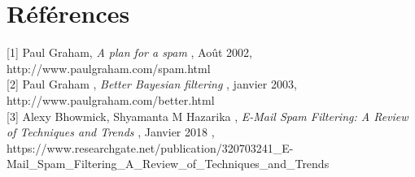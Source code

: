 \documentclass{article}
\begin{document}
\section{Références}


[1] Paul Graham, \textit{A plan for a spam}
, Août 2002, http://www.paulgraham.com/spam.html\\

[2] Paul Graham , \textit{Better Bayesian filtering}
, janvier 2003, http://www.paulgraham.com/better.html\\

[3] Alexy Bhowmick, Shyamanta M Hazarika , \textit{E-Mail Spam Filtering: A Review of Techniques and Trends}
, Janvier 2018 ,  https://www.researchgate.net/publication/320703241\_E-Mail\_Spam\_Filtering\_A\_Review\_of\_Techniques\_and\_Trends\\
%
\end{document}
